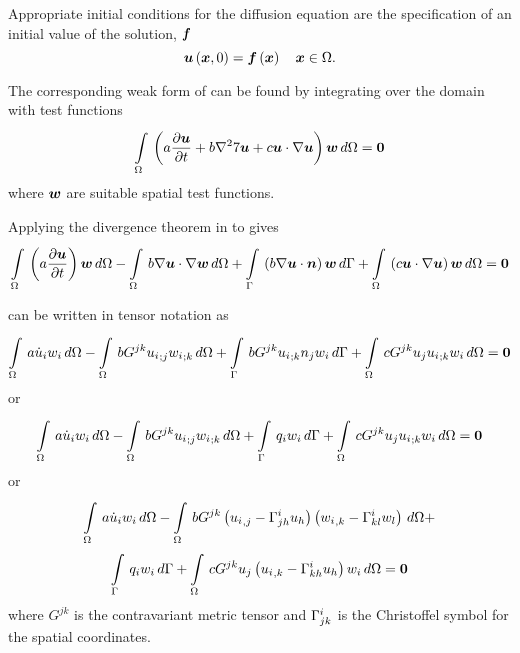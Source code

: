 Appropriate initial conditions for the diffusion equation are the
specification of an initial value of the solution, $\boldsymbol{f}$ \ie
\begin{equation}
  \fnof{\vectr{u}}{\vectr{x},0} = \fnof{\vectr{f}}{\vectr{x}} \quad \vectr{x}\in\Omega.
  \label{eqn:BurgersInitialC} 
\end{equation}


The corresponding weak form of  can be
found by integrating over the domain with test functions \ie
\begin{equation}
  \gint{\Omega}{}{\pbrac{a\delby{\vectr{u}}{t}+
      b\laplacian{}{7\vectr{u}}+
      c\dotprod{\vectr{u}}{\gradient{}{\vectr{u}}}}\vectr{w}}{\Omega}=\vectr{0}
  \label{eqn:Burgersweakform1}
\end{equation}
where $\boldsymbol{w}$ are suitable spatial test functions.

Applying the divergence theorem in  to  gives
\begin{equation}
  \gint{\Omega}{}{\pbrac{a\delby{\vectr{u}}{t}}\vectr{w}}{\Omega}-
      \gint{\Omega}{}{b\dotprod{\gradient{}{\vectr{u}}}{\gradient{}{\vectr{w}}}}{\Omega}
      +\gint{\Gamma}{}{\pbrac{b\dotprod{\gradient{}{\vectr{u}}}{\normal}}\vectr{w}}{\Gamma}+
      \gint{\Omega}{}{\pbrac{c\dotprod{\vectr{u}}{\gradient{}{\vectr{u}}}}\vectr{w}}{\Omega}
      =\vectr{0}
  \label{eqn:Burgersweakform2}
\end{equation}


 can be written in tensor notation as
\begin{equation}
  \gint{\Omega}{}{a\dot{u}_{i}w_{i}}{\Omega}-
  \gint{\Omega}{}{bG^{jk}\covarderiv{u_{i}}{j}\covarderiv{w_{i}}{k}}{\Omega}+
  \gint{\Gamma}{}{bG^{jk}\covarderiv{u_{i}}{k}n_{j}w_{i}}{\Gamma} +
  \gint{\Omega}{}{cG^{jk}u_{j}\covarderiv{u_{i}}{k}w_{i}}{\Omega}=\vectr{0}
  \label{eqn:Burgerstensorform1}
\end{equation}
or
\begin{equation}
  \gint{\Omega}{}{a\dot{u}_{i}w_{i}}{\Omega}-
  \gint{\Omega}{}{bG^{jk}\covarderiv{u_{i}}{j}\covarderiv{w_{i}}{k}}{\Omega}+
  \gint{\Gamma}{}{q_{i}w_{i}}{\Gamma} +
  \gint{\Omega}{}{cG^{jk}u_{j}\covarderiv{u_{i}}{k}w_{i}}{\Omega}=\vectr{0}
  \label{eqn:Burgerstensorform2}
\end{equation}
or
\begin{multline}
  \gint{\Omega}{}{a\dot{u}_{i}w_{i}}{\Omega}-
  \gint{\Omega}{}{bG^{jk}\pbrac{\partialderiv{u_{i}}{j}-\christoffel{i}{j}{h}u_{h}}
    \pbrac{\partialderiv{w_{i}}{k}-\christoffel{i}{k}{l}w_{l}}}{\Omega}+ \\
  \gint{\Gamma}{}{q_{i}w_{i}}{\Gamma} +
  \gint{\Omega}{}{cG^{jk}u_{j}\pbrac{\partialderiv{u_{i}}{k}-
      \christoffel{i}{k}{h}u_{h}}w_{i}}{\Omega}=\vectr{0}
  \label{eqn:Burgerstensorform3}
\end{multline}
where $G^{jk}$ is the contravariant metric tensor and $ \Gamma^{i}_{jk} $
is the Christoffel symbol for the spatial coordinates.

